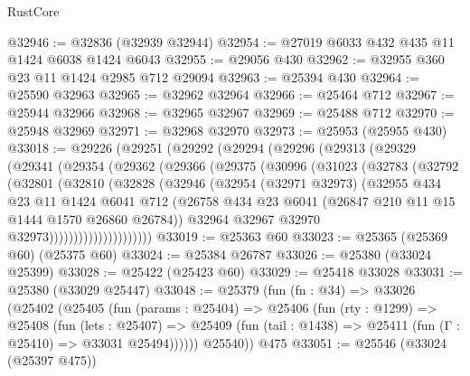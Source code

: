 \begin{lexlean}{RustCore}
\begin{coremodule}
@32946 := @32836 (@32939 @32944)
@32954 := @27019 @6033 @432 @435 @11 @1424 @6038 @1424 @6043
@32955 := @29056 @430
@32962 := @32955 @360 @23 @11 @1424 @2985 @712 @29094
@32963 := @25394 @430
@32964 := @25590 @32963
@32965 := @32962 @32964
@32966 := @25464 @712
@32967 := @25944 @32966
@32968 := @32965 @32967
@32969 := @25488 @712
@32970 := @25948 @32969
@32971 := @32968 @32970
@32973 := @25953 (@25955 @430)
@33018 := @29226
    (@29251
      (@29292
        (@29294
          (@29296
            (@29313
              (@29329
                (@29341
                  (@29354
                    (@29362
                      (@29366
                        (@29375
                          (@30996
                            (@31023
                              (@32783
                                (@32792
                                  (@32801
                                    (@32810
                                      (@32828
                                        (@32946
                                          (@32954
                                            (@32971 @32973)
                                            (@32955
                                              @434
                                              @23
                                              @11
                                              @1424
                                              @6041
                                              @712
                                              (@26758
                                                @434
                                                @23
                                                @6041
                                                (@26847 @210 @11 @15 @1444 @1570 @26860 @26784))
                                              @32964
                                              @32967
                                              @32970
                                              @32973)))))))))))))))))))))
@33019 := @25363 @60
@33023 := @25365 (@25369 @60) (@25375 @60)
@33024 := @25384 @26787
@33026 := @25380 (@33024 @25399)
@33028 := @25422 (@25423 @60)
@33029 := @25418 @33028
@33031 := @25380 (@33029 @25447)
@33048 := @25379
    (fun (fn : @34) =>
    @33026
      (@25402
        (@25405
          (fun (params : @25404) =>
          @25406
            (fun (rty : @1299) =>
            @25408
              (fun (lets : @25407) =>
              @25409 (fun (tail : @1438) => @25411 (fun (Γ : @25410) => @33031 @25494))))))
        @25540))
    @475
@33051 := @25546 (@33024 (@25397 @475))

\end{coremodule}
\end{lexlean}
